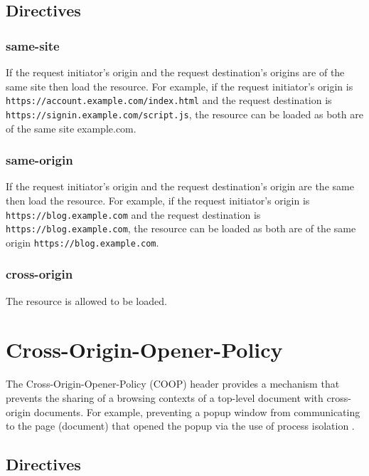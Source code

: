 \documentclass{mscreport}
\begin{document}
\subsection{Directives}

\subsubsection{same-site}

If the request initiator’s origin and the request destination’s origins are of the same site then load the resource. For example, if the request initiator’s origin is \newline \texttt{https://account.example.com/index.html} and the request destination is \newline \texttt{https://signin.example.com/script.js}, the resource can be loaded as both are of the same site example.com.

\subsubsection{same-origin}

If the request initiator’s origin and the request destination’s origin are the same then load the resource. For example, if the request initiator’s origin is \texttt{https://blog.example.com} and the request destination is \texttt{https://blog.example.com}, the resource can be loaded as both are of the same origin \texttt{https://blog.example.com}.

\subsubsection{cross-origin}

The resource is allowed to be loaded.

\section{Cross-Origin-Opener-Policy}
\label{section:coop}

The Cross-Origin-Opener-Policy (COOP) header provides a mechanism that prevents the sharing of a browsing contexts of a top-level document with cross-origin documents. For example, preventing a popup window from communicating to the page (document) that opened the popup via the use of process isolation \cite{Apple_undated-gj}.

\subsection{Directives}
\end{document}
